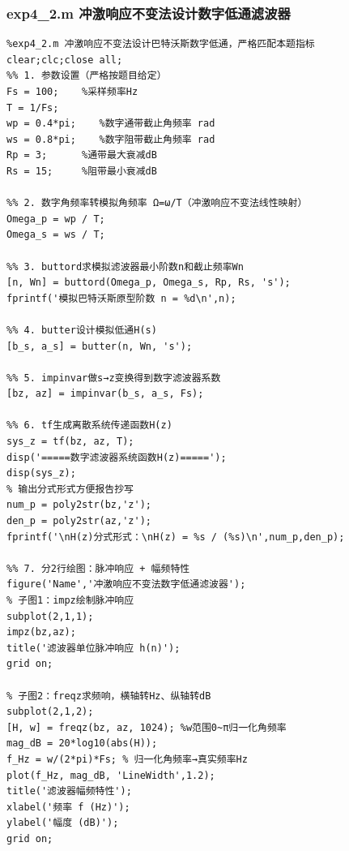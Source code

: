 \subsubsection{exp4\_2.m 冲激响应不变法设计数字低通滤波器}
\begin{lstlisting}
%exp4_2.m 冲激响应不变法设计巴特沃斯数字低通，严格匹配本题指标
clear;clc;close all;
%% 1. 参数设置（严格按题目给定）
Fs = 100;    %采样频率Hz
T = 1/Fs;
wp = 0.4*pi;    %数字通带截止角频率 rad
ws = 0.8*pi;    %数字阻带截止角频率 rad
Rp = 3;      %通带最大衰减dB
Rs = 15;     %阻带最小衰减dB

%% 2. 数字角频率转模拟角频率 Ω=ω/T（冲激响应不变法线性映射）
Omega_p = wp / T;
Omega_s = ws / T;

%% 3. buttord求模拟滤波器最小阶数n和截止频率Wn
[n, Wn] = buttord(Omega_p, Omega_s, Rp, Rs, 's');
fprintf('模拟巴特沃斯原型阶数 n = %d\n',n);

%% 4. butter设计模拟低通H(s)
[b_s, a_s] = butter(n, Wn, 's');

%% 5. impinvar做s→z变换得到数字滤波器系数
[bz, az] = impinvar(b_s, a_s, Fs);

%% 6. tf生成离散系统传递函数H(z)
sys_z = tf(bz, az, T);
disp('=====数字滤波器系统函数H(z)=====');
disp(sys_z);
% 输出分式形式方便报告抄写
num_p = poly2str(bz,'z');
den_p = poly2str(az,'z');
fprintf('\nH(z)分式形式：\nH(z) = %s / (%s)\n',num_p,den_p);

%% 7. 分2行绘图：脉冲响应 + 幅频特性
figure('Name','冲激响应不变法数字低通滤波器');
% 子图1：impz绘制脉冲响应
subplot(2,1,1);
impz(bz,az);
title('滤波器单位脉冲响应 h(n)');
grid on;

% 子图2：freqz求频响，横轴转Hz、纵轴转dB
subplot(2,1,2);
[H, w] = freqz(bz, az, 1024); %w范围0~π归一化角频率
mag_dB = 20*log10(abs(H));
f_Hz = w/(2*pi)*Fs; % 归一化角频率→真实频率Hz
plot(f_Hz, mag_dB, 'LineWidth',1.2);
title('滤波器幅频特性');
xlabel('频率 f (Hz)');
ylabel('幅度 (dB)');
grid on;
\end{lstlisting}

